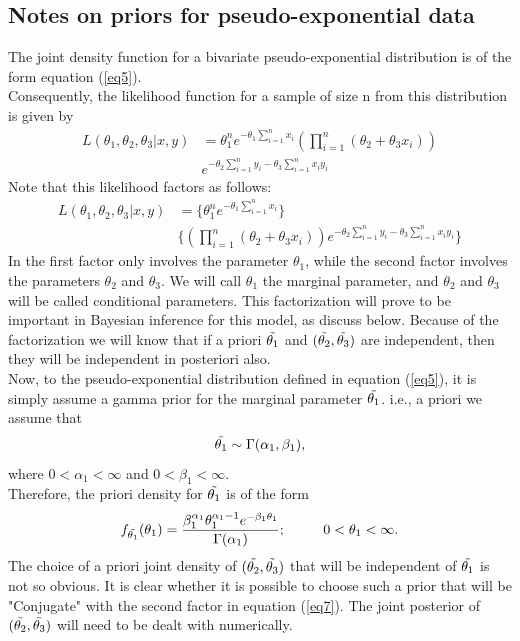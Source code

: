 \documentclass[12pt]{article}    %
\numberwithin{equation}{section}
\begin{document}
\subsection{Notes on priors for pseudo-exponential data} \label{subsec:statistical-summaries}
The joint density function for a bivariate pseudo-exponential distribution is of the form equation (\ref{eq5}).\\
Consequently, the likelihood function for a sample of size n from this distribution is given by
\begin{equation}\label{eq6}
\begin{split}
L(\theta_1,\theta_2,\theta_3|x,y) &= \theta^n_1e^{-\theta_1\sum^n_{i=1}{x_i}} (\prod^n_{i=1}(\theta_2 + \theta_3{x_i})) \\
& e^{-\theta_2\sum^n_{i=1}{y_i} - \theta_3\sum^n_{i=1}{x_iy_i}}
\end{split}
\end{equation}
Note that this likelihood factors as follows:
\begin{equation}\label{eq7}
\begin{split}
L(\theta_1,\theta_2,\theta_3|x,y) &= \Big\{\theta^n_1e^{-\theta_1\sum^n_{i=1}{x_i}}\Big\} \\
& \Big\{(\prod^n_{i=1}(\theta_2 + \theta_3{x_i})) e^{-\theta_2\sum^n_{i=1}{y_i} - \theta_3\sum^n_{i=1}{x_iy_i}}\Big\}
\end{split}
\end{equation}
In the first factor only involves the parameter $\theta_1$, while the second factor involves the parameters $\theta_2$ and $\theta_3$. We will call $\theta_1$ the marginal parameter, and $\theta_2$ and $\theta_3$ will be called conditional parameters. This factorization will prove to be important in Bayesian inference for this model, as discuss below. Because of the factorization we will know that if a priori $\Tilde{\theta_1}$ and $(\Tilde{\theta_2}, \Tilde{\theta_3})$ are independent, then they will be independent in posteriori also.\\
Now, to the pseudo-exponential distribution defined in equation (\ref{eq5}), it is simply assume a gamma prior for the marginal parameter $\Tilde{\theta_1}$. i.e., a priori we assume that 
\begin{equation}\label{eq8}
\Tilde{\theta_1} \sim \Gamma(\alpha_1,\beta_1), 
\end{equation}
where $0 < \alpha_1 < \infty$ and $0 < \beta_1 < \infty$.\\
Therefore, the priori density for $\Tilde{\theta_1}$ is of the form
\begin{equation*}
f_{\Tilde{\theta_1}}(\theta_1) = \frac{\beta^{\alpha_1}_1\theta_1^{\alpha_1-1}e^{-\beta_1\theta_1}}{\Gamma(\alpha_1)};~~~~~~~~ 0<\theta_1<\infty.
\end{equation*}
The choice of  a priori joint density of $(\Tilde{\theta_2}, \Tilde{\theta_3})$ that will be independent of $\Tilde{\theta_1}$ is not so obvious. It is clear whether it is possible to choose such a prior that will be "Conjugate" with the second factor in equation (\ref{eq7}). The joint posterior of $(\Tilde{\theta_2}, \Tilde{\theta_3})$ will need to be dealt with numerically.
\end{document}
